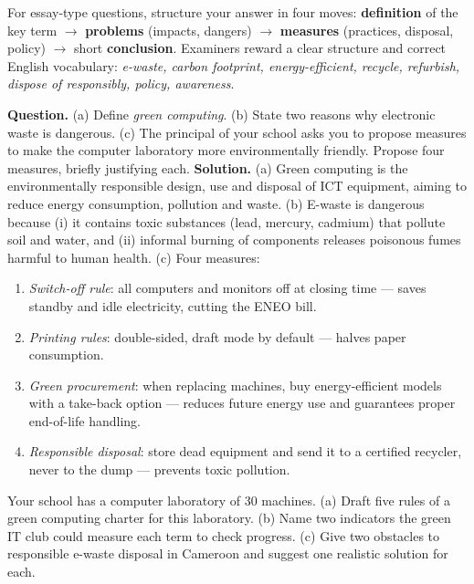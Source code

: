 \documentclass[11pt]{article}
\begin{document}
\begin{exemplebox}
For essay-type questions, structure your answer in four moves: \textbf{definition} of the key term $\to$ \textbf{problems} (impacts, dangers) $\to$ \textbf{measures} (practices, disposal, policy) $\to$ short \textbf{conclusion}. Examiners reward a clear structure and correct English vocabulary: \emph{e-waste, carbon footprint, energy-efficient, recycle, refurbish, dispose of responsibly, policy, awareness}.
\end{exemplebox}

\begin{exoresolu}
\textbf{Question.} (a) Define \emph{green computing}. (b) State two reasons why electronic waste is dangerous. (c) The principal of your school asks you to propose measures to make the computer laboratory more environmentally friendly. Propose four measures, briefly justifying each.
\tcblower
\textbf{Solution.} (a) Green computing is the environmentally responsible design, use and disposal of ICT equipment, aiming to reduce energy consumption, pollution and waste.
(b) E-waste is dangerous because (i) it contains toxic substances (lead, mercury, cadmium) that pollute soil and water, and (ii) informal burning of components releases poisonous fumes harmful to human health.
(c) Four measures:
\begin{enumerate}
\item \emph{Switch-off rule}: all computers and monitors off at closing time — saves standby and idle electricity, cutting the ENEO bill.
\item \emph{Printing rules}: double-sided, draft mode by default — halves paper consumption.
\item \emph{Green procurement}: when replacing machines, buy energy-efficient models with a take-back option — reduces future energy use and guarantees proper end-of-life handling.
\item \emph{Responsible disposal}: store dead equipment and send it to a certified recycler, never to the dump — prevents toxic pollution.
\end{enumerate}
\end{exoresolu}

\begin{exercice}
Your school has a computer laboratory of 30 machines. (a) Draft five rules of a green computing charter for this laboratory. (b) Name two indicators the green IT club could measure each term to check progress. (c) Give two obstacles to responsible e-waste disposal in Cameroon and suggest one realistic solution for each.
\end{exercice}
\end{document}
